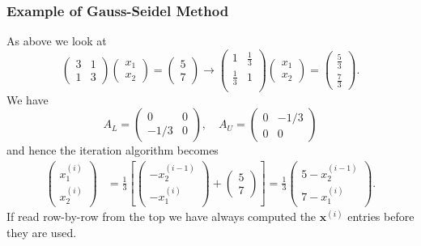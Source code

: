 \documentclass{beamer}
\newcommand{\bx}{{\boldsymbol{x}}}
\begin{document}
\begin{frame}
  \frametitle{Example of Gauss-Seidel Method}

  As above we look at
  \begin{equation*}
    \begin{pmatrix}
      3 & 1 \\
      1 & 3
    \end{pmatrix}
    \begin{pmatrix}
      x_1 \\ x_2
    \end{pmatrix} =
    \begin{pmatrix}
      5 \\ 7
    \end{pmatrix} \rightarrow
    \begin{pmatrix}
      1 & \tfrac{1}{3} \\
      \tfrac{1}{3} & 1 \\
    \end{pmatrix}
    \begin{pmatrix}
      x_1 \\ x_2
    \end{pmatrix} =
    \begin{pmatrix}
      \tfrac{5}{3} \\ \tfrac{7}{3}
    \end{pmatrix}.
  \end{equation*}
  We have
  \begin{equation*}
    A_L =
    \begin{pmatrix}
      0 & 0 \\
      -1/3 & 0
    \end{pmatrix}, \quad
    A_U =
    \begin{pmatrix}
      0 & -1/3 \\
      0 & 0
    \end{pmatrix}
  \end{equation*}
  and hence the iteration algorithm becomes
  \begin{align*}
    \begin{pmatrix}
      x_1^{(i)} \\ x_2^{(i)}
    \end{pmatrix} & = \frac{1}{3} \left[
      \begin{pmatrix}
        -x_2^{(i-1)} \\ - x_1^{(i)}
      \end{pmatrix} +
      \begin{pmatrix}
        5 \\ 7
      \end{pmatrix} \right]
    = \frac{1}{3}
    \begin{pmatrix}
      5 - x_2^{(i-1)} \\ 7 - x_1^{(i)}
    \end{pmatrix}.
  \end{align*}
  If read row-by-row from the top we have always computed the
  $\bx^{(i)}$ entries before they are used.

\end{frame}
\end{document}
